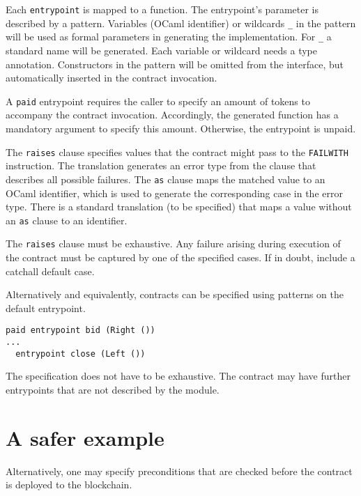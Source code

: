 \documentclass[a4paper]{llncs}
\begin{document}
Each \lstinline/entrypoint/ is mapped to a function. The entrypoint's
parameter is described by a pattern.  Variables (OCaml identifier) or
wildcards \lstinline/_/ in the pattern will be used as formal
parameters in generating the implementation. For \lstinline/_/ a
standard name will be generated. Each variable or wildcard needs a
type annotation. Constructors in the pattern will be
omitted from the interface, but automatically inserted in the contract
invocation. 

A \lstinline/paid/ entrypoint requires the caller to specify an amount of tokens to
accompany the contract invocation. Accordingly, the generated function
has a mandatory argument to specify this amount. Otherwise, the entrypoint is unpaid. 

The \lstinline/raises/ clause specifies values that the contract might
pass to the \texttt{FAILWITH} instruction. The translation generates
an error type from the clause that describes all possible
failures. The \lstinline/as/ clause 
maps the matched value to an OCaml identifier, which is used to
generate the corresponding case in the error type. There is a standard
translation (to be specified) that maps a value without an
\lstinline/as/ clause to an identifier.

The \lstinline/raises/ clause must be exhaustive. Any failure arising
during execution of the contract must be captured by one of the
specified cases. If in doubt, include a catchall default case.

Alternatively and equivalently, contracts can be specified using
patterns on the default entrypoint.

\begin{lstlisting}[caption={Alternative syntax for entrypoints},label={lst:alternative-syntax}]
  paid entrypoint bid (Right ())
...
  entrypoint close (Left ())
\end{lstlisting}

The specification does not have to be exhaustive. The contract may
have further entrypoints that are not described by the module.

\clearpage{}
\section{A safer example}
\label{sec:safe-example}

Alternatively, one may specify preconditions that are checked before
the contract is deployed to the blockchain. 
\end{document}
